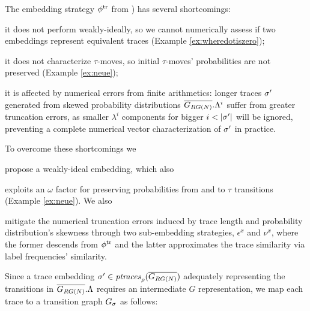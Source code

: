{{The embedding strategy} $\trembed$ from \cite{LodhiSSCW02,Raedt}) {has several short\-comings:}
\begin{alphalist}
 \item it does not perform weakly-ideally, so we cannot numerically assess if two embeddings represent equivalent traces (Example \ref{ex:wheredotiszero});
 \item it does not characterize $\tau$-moves, so initial $\tau$-moves' probabilities are not preserved (Example \ref{ex:neue});
 \item it is affected by numerical errors from finite arithmetics: longer traces $\nonlogtrace$ generated from skewed probability distributions $\expN.\Lambda^i$ suffer from greater truncation errors, as smaller $\lambda^i$ components for bigger $i<|\nonlogtrace|$ will be ignored, preventing a complete numerical vector characterization of  $\nonlogtrace$ in practice.
\end{alphalist}

{To overcome these shortcomings we} \begin{alphalist} \item propose a weakly-ideal embedding, which also \item exploits an
$\omega$ factor for preserving probabilities from and to $\tau$ transitions (Example \ref{ex:neue}). We also \item mitigate the
numerical truncation errors induced by trace length and probability distribution's skewness through two sub-embedding strategies,
$\epsilon^x$ and $\nu^x$, where the former descends from $\trembed$ and the latter approximates the trace similarity via label frequencies' similarity.
\end{alphalist}

Since a trace embedding $\nonlogtrace\in\WCal{\pmin}{n}$ adequately representing the transitions in $\expN.\Lambda$ requires an intermediate $G$ representation, we map each trace to a transition graph $\tg_\sigma$ as follows:}
